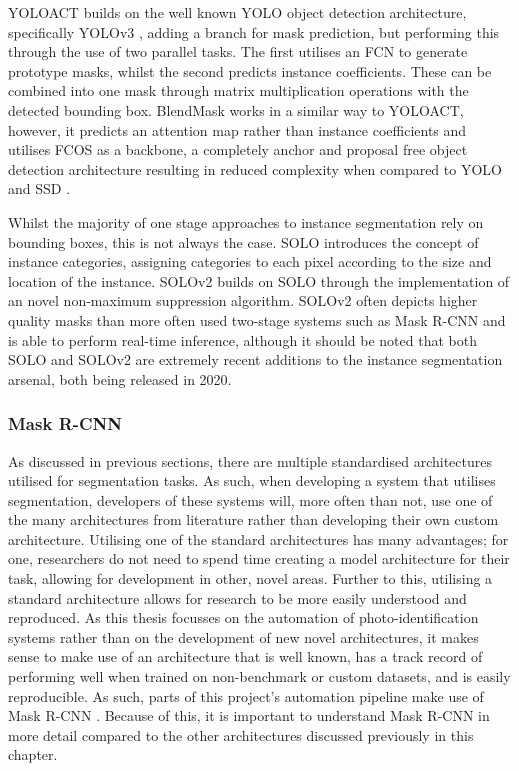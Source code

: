 YOLOACT \cite{bolya_190402689_2019} builds on the well known YOLO object detection architecture, specifically YOLOv3 \cite{redmon_yolov3_2018}, adding a branch for mask prediction, but performing this through the use of two parallel tasks. The first utilises an FCN to generate prototype masks, whilst the second predicts instance coefficients. These can be combined into one mask through matrix multiplication operations with the detected bounding box. BlendMask \cite{chen_blendmask_2020} works in a similar way to YOLOACT, however, it predicts an attention map rather than instance coefficients and utilises FCOS \cite{tian_fcos_2019} as a backbone, a completely anchor and proposal free object detection architecture resulting in reduced complexity when compared to YOLO \cite{redmon_you_2016} and SSD \cite{liu_ssd:_2016}. 

Whilst the majority of one stage approaches to instance segmentation rely on bounding boxes, this is not always the case. SOLO \cite{wang_solo_2020} introduces the concept of instance categories, assigning categories to each pixel according to the size and location of the instance. SOLOv2 \cite{wang_solov2_2020} builds on SOLO through the implementation of an novel non-maximum suppression algorithm. SOLOv2 often depicts higher quality masks than more often used two-stage systems such as Mask R-CNN and is able to perform real-time inference, although it should be noted that both SOLO and SOLOv2 are extremely recent additions to the instance segmentation arsenal, both being released in 2020. 

\subsubsection{Mask R-CNN}\label{ch:Background,sec:instanceSegmentation,sub:Mask R-CNN}

As discussed in previous sections, there are multiple standardised architectures utilised for segmentation tasks. As such, when developing a system that utilises segmentation, developers of these systems will, more often than not, use one of the many architectures from literature rather than developing their own custom architecture. Utilising one of the standard architectures has many advantages; for one, researchers do not need to spend time creating a model architecture for their task, allowing for development in other, novel areas. Further to this, utilising a standard architecture allows for research to be more easily understood and reproduced. As this thesis focusses on the automation of photo-identification systems rather than on the development of new novel architectures, it makes sense to make use of an architecture that is well known, has a track record of performing well when trained on non-benchmark or custom datasets, and is easily reproducible. As such, parts of this project's automation pipeline make use of Mask R-CNN \cite{he_mask_2017}. Because of this, it is important to understand Mask R-CNN in more detail compared to the other architectures discussed previously in this chapter. 

